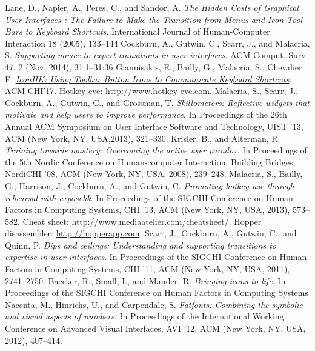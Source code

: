 \documentclass[12pt,a4paper]{article}
\begin{document}
\begin{thebibliography}{20}
 Lane, D., Napier, A., Peres, C., and Sandor, A. \textit{The Hidden Costs of Graphical User Interfaces : The Failure to Make the Transition from Menus and Icon Tool Bars to Keyboard Shortcuts}. International Journal of Human-Computer Interaction 18 (2005), 133–144
 Cockburn, A., Gutwin, C., Scarr, J., and Malacria, S. \textit{Supporting novice to expert transitions in user interfaces}. ACM Comput. Surv. 47, 2 (Nov. 2014), 31:1–31:36
 Giannisakis, E., Bailly, G., Malacria, S., Chevalier F. \textit{\href{https://www.gillesbailly.fr/publis/iconhk/BAILLY_iconhk.pdf}{IconHK: Using Toolbar Button Icons to Communicate
	Keyboard Shortcuts}}. ACM CHI'17.
 Hotkey-eve: \href{http://www.hotkey-eve.com}{http://www.hotkey-eve.com}.
 Malacria, S., Scarr, J., Cockburn, A., Gutwin, C., and Grossman, T. \textit{Skillometers: Reflective widgets that motivate and help users to improve performance}. In Proceedings of the 26th Annual ACM Symposium on User Interface Software and Technology, UIST ’13, ACM (New York, NY, USA,2013), 321–330.
 Krisler, B., and Alterman, R. \textit{Training towards mastery: Overcoming the active user paradox}. In Proceedings of the 5th Nordic Conference on Human-computer Interaction: Building Bridges, NordiCHI ’08, ACM (New York, NY, USA, 2008), 239–248.
 Malacria, S., Bailly, G., Harrison, J., Cockburn, A., and Gutwin, C. \textit{Promoting hotkey use through rehearsal with exposehk}. In Proceedings of the SIGCHI Conference on Human Factors in Computing Systems, CHI ’13, ACM (New York, NY, USA, 2013), 573–582.
 Cheat sheet: \href{http://www.mediaatelier.com/cheatsheet/}{http://www.mediaatelier.com/cheatsheet/}.
 Hopper disassembler: \href{http://hopperapp.com}{http://hopperapp.com}.
 Scarr, J., Cockburn, A., Gutwin, C., and Quinn, P. \textit{Dips and ceilings: Understanding and supporting transitions to expertise in user interfaces}. In Proceedings of the SIGCHI Conference on Human Factors in Computing Systems, CHI ’11, ACM (New York, NY, USA, 2011), 2741–2750.
 Baecker, R., Small, I., and Mander, R. \textit{Bringing icons to life}. In Proceedings of the SIGCHI Conference on Human Factors in Computing Systems
 Nacenta, M., Hinrichs, U., and Carpendale, S. \textit{Fatfonts: Combining the symbolic and visual aspects of numbers}. In Proceedings of the International Working Conference on Advanced Visual Interfaces, AVI ’12, ACM (New York, NY, USA, 2012), 407–414.

\end{thebibliography}
\end{document}
